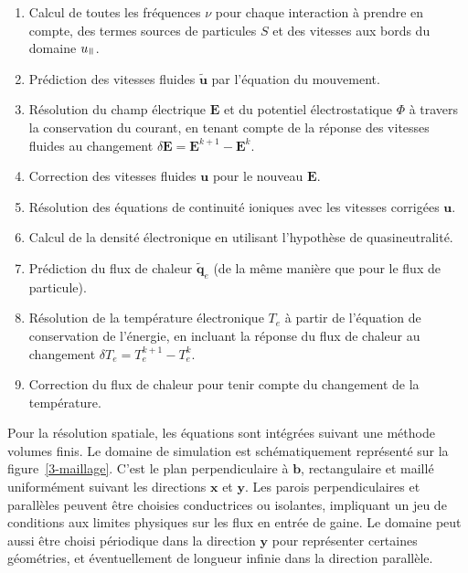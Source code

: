 \begin{refsection}
\begin{enumerate}
  \item Calcul de toutes les fréquences $\nu$ pour
  chaque interaction à prendre en compte, des termes sources de particules
  $S$ et des vitesses aux bords du domaine $u_{\para}$.
  \item Prédiction des vitesses fluides $\tilde{\mathbf u}$ par
  l'équation du mouvement.
  \item Résolution du champ électrique $\mathbf E$ et du potentiel
  électrostatique $\Phi$ à travers la conservation du courant, en tenant compte de la
  réponse des vitesses fluides au changement $\delta \mathbf
  E=\mathbf E^{k+1}-\mathbf E^{k}$.
  \item Correction des vitesses fluides $\mathbf u$ pour le nouveau
  $\mathbf E$.
  \item Résolution des équations de continuité ioniques avec les vitesses
  corrigées $\mathbf u$.
  \item Calcul de la densité électronique en utilisant l'hypothèse de
  quasineutralité.
  \item Prédiction du flux de chaleur $\tilde{\mathbf q}_e$ (de la même manière
  que pour le flux de particule).
  \item Résolution de la température électronique $T_e$ à partir de l'équation
  de conservation de l'énergie, en incluant la réponse du flux de chaleur au
  changement $\delta T_e=T_e^{k+1}-T_e^{k}$.
  \item Correction du flux de chaleur pour tenir compte du changement de la
  température.
\end{enumerate}

Pour la résolution spatiale, les équations sont intégrées suivant une méthode
volumes finis. Le domaine de simulation est schématiquement représenté sur la figure~\ref{3-maillage}.
C'est le plan perpendiculaire à $\mathbf{b}$, rectangulaire et maillé uniformément suivant
les directions $\mathbf{x}$ et $\mathbf{y}$. Les parois perpendiculaires
et parallèles peuvent être choisies conductrices ou isolantes, impliquant un jeu
de conditions aux limites physiques sur les flux en entrée de gaine. Le domaine
peut aussi être choisi périodique dans la direction $\mathbf y$ pour représenter
certaines géométries, et éventuellement de longueur infinie dans la direction
parallèle.


\end{refsection}
